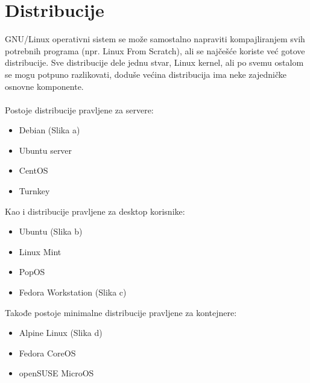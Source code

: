 \documentclass[a4paper,14pt]{article}
\begin{document}
\section{Distribucije}
GNU/Linux operativni sistem se može samostalno napraviti kompajliranjem svih potrebnih programa (npr. Linux From Scratch), ali se najčešće koriste već gotove distribucije. Sve distribucije dele jednu stvar, Linux kernel, ali po svemu ostalom se mogu potpuno razlikovati, doduše većina distribucija ima neke zajedničke osnovne komponente.
\\\\
Postoje distribucije pravljene za servere:
\begin{itemize}
\item Debian (Slika a)
\item Ubuntu server
\item CentOS
\item Turnkey
\end{itemize}
Kao i distribucije pravljene za desktop korisnike:
\begin{itemize}
\item Ubuntu (Slika b)
\item Linux Mint
\item PopOS
\item Fedora Workstation (Slika c)
\end{itemize}
Takođe postoje minimalne distribucije pravljene za kontejnere:
\begin{itemize}
\item Alpine Linux (Slika d)
\item Fedora CoreOS
\item openSUSE MicroOS
\end{itemize}
\end{document}
